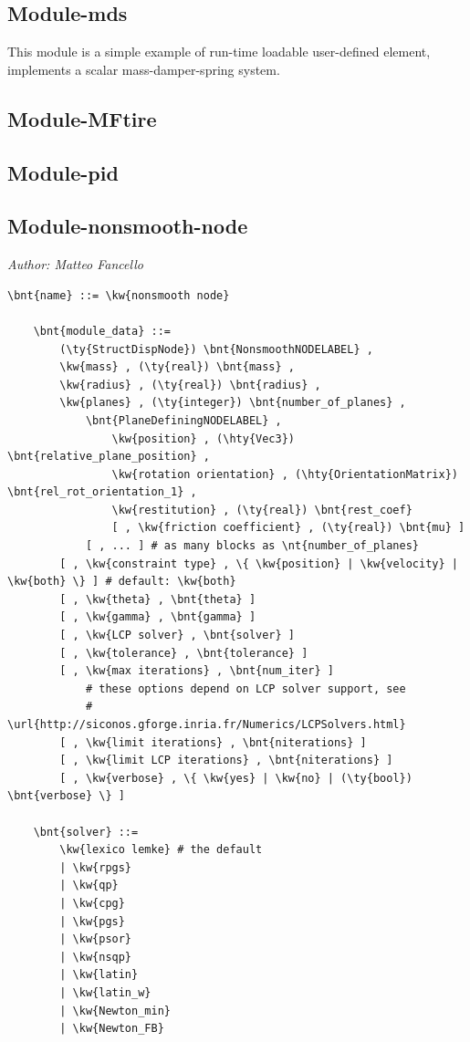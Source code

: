 \subsection{Module-mds}
This module is a simple example of run-time loadable user-defined element,
implements a scalar mass-damper-spring system.

\subsection{Module-MFtire}


\subsection{Module-pid}





\subsection{Module-nonsmooth-node}
\emph{Author: Matteo Fancello}
\begin{Verbatim}[commandchars=\\\{\}]
    \bnt{name} ::= \kw{nonsmooth node}

    \bnt{module_data} ::=
        (\ty{StructDispNode}) \bnt{NonsmoothNODELABEL} ,
        \kw{mass} , (\ty{real}) \bnt{mass} ,
        \kw{radius} , (\ty{real}) \bnt{radius} ,
        \kw{planes} , (\ty{integer}) \bnt{number_of_planes} ,
            \bnt{PlaneDefiningNODELABEL} ,
                \kw{position} , (\hty{Vec3}) \bnt{relative_plane_position} ,
                \kw{rotation orientation} , (\hty{OrientationMatrix}) \bnt{rel_rot_orientation_1} ,
                \kw{restitution} , (\ty{real}) \bnt{rest_coef}
                [ , \kw{friction coefficient} , (\ty{real}) \bnt{mu} ] 
            [ , ... ] # as many blocks as \nt{number_of_planes}
        [ , \kw{constraint type} , \{ \kw{position} | \kw{velocity} | \kw{both} \} ] # default: \kw{both}
        [ , \kw{theta} , \bnt{theta} ]
        [ , \kw{gamma} , \bnt{gamma} ]
        [ , \kw{LCP solver} , \bnt{solver} ]
        [ , \kw{tolerance} , \bnt{tolerance} ]
        [ , \kw{max iterations} , \bnt{num_iter} ]
            # these options depend on LCP solver support, see
            # \url{http://siconos.gforge.inria.fr/Numerics/LCPSolvers.html}
        [ , \kw{limit iterations} , \bnt{niterations} ]
        [ , \kw{limit LCP iterations} , \bnt{niterations} ]
        [ , \kw{verbose} , \{ \kw{yes} | \kw{no} | (\ty{bool}) \bnt{verbose} \} ]

    \bnt{solver} ::=
        \kw{lexico lemke} # the default
        | \kw{rpgs}
        | \kw{qp}
        | \kw{cpg}
        | \kw{pgs}
        | \kw{psor}
        | \kw{nsqp}
        | \kw{latin}
        | \kw{latin_w}
        | \kw{Newton_min}
        | \kw{Newton_FB}
\end{Verbatim}

